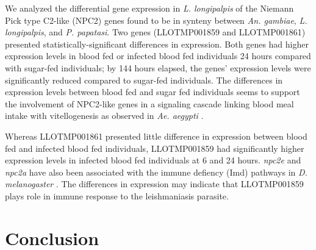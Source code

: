 We analyzed the differential gene expression in \emph{L. longipalpis} of the Niemann Pick type C2-like (NPC2) genes found to be in synteny between \emph{An. gambiae}, \emph{L. longipalpis}, and \emph{P. papatasi}.  Two genes (LLOTMP001859 and LLOTMP001861) presented statistically-significant differences in expression. Both genes had higher expression levels in blood fed or infected blood fed individuals 24 hours compared with sugar-fed individuals; by 144 hours elapsed, the genes' expression levels were significantly reduced compared to sugar-fed individuals.  The differences in expression levels between blood fed and sugar fed individuals seems to support the involvement of NPC2-like genes in a signaling cascade linking blood meal intake with vitellogenesis as observed in \emph{Ae. aegypti} \cite{Sirot2011}.

Whereas LLOTMP001861 presented little difference in expression between blood fed and infected blood fed individuals, LLOTMP001859 had significantly higher expression levels in infected blood fed individuals at 6 and 24 hours.  \emph{npc2e} and \emph{npc2a} have also been associated with the immune defiency (Imd) pathways in \emph{D. melanogaster} \cite{Shi2012}.  The differences in expression may indicate that LLOTMP001859 plays role in immune response to the leishmaniasis parasite.

\section{Conclusion}





